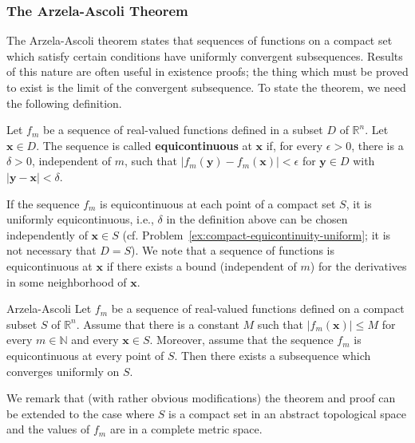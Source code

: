\subsubsection{The Arzela-Ascoli Theorem}\label{subsec:arzela-ascoli-theorem}

The Arzela-Ascoli theorem states that sequences of functions on a compact set which satisfy certain conditions have uniformly convergent subsequences. Results of this nature are often useful in existence proofs; the thing which must be proved to exist is the limit of the convergent subsequence. To state the theorem, we need the following definition.

\begin{Definition}
\label{def:equicontinuity}
Let $f_m$ be a sequence of real-valued functions defined in a subset $D$ of $\mathbb{R}^n$. Let $\bm{x}\in D$. The sequence is called \textbf{equicontinuous} at $\bm{x}$ if, for every $\epsilon>0$, there is a $\delta>0$, independent of $m$, such that $|f_m(\bm{y})-f_m(\bm{x})|<\epsilon$ for $\bm{y}\in D$ with $|\bm{y}-\bm{x}|<\delta$.
\end{Definition}

If the sequence $f_m$ is equicontinuous at each point of a compact set $S$, it is uniformly equicontinuous, i.e., $\delta$ in the definition above can be chosen independently of $\bm{x}\in S$ (cf. Problem~\ref{ex:compact-equicontinuity-uniform}; it is not necessary that $D=S$). We note that a sequence of functions is equicontinuous at $\bm{x}$ if there exists a bound (independent of $m$) for the derivatives in some neighborhood of $\bm{x}$.

\begin{Theorem}{Arzela-Ascoli}
\label{thm:arzela-ascoli}
Let $f_m$ be a sequence of real-valued functions defined on a compact subset $S$ of $\mathbb{R}^n$. Assume that there is a constant $M$ such that $|f_m(\bm{x})|\leq M$ for every $m\in\mathbb{N}$ and every $\bm{x}\in S$. Moreover, assume that the sequence $f_m$ is equicontinuous at every point of $S$. Then there exists a subsequence which converges uniformly on $S$.
\end{Theorem}

We remark that (with rather obvious modifications) the theorem and proof can be extended to the case where $S$ is a compact set in an abstract topological space and the values of $f_m$ are in a complete metric space.

